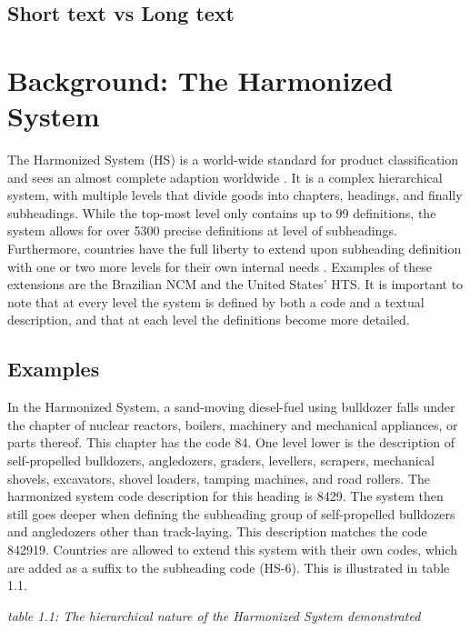 \subsection{Short text vs Long text}

\section{Background: The Harmonized System}
The Harmonized System (HS) is a world-wide standard for product classification and sees an almost complete adaption worldwide \cite{}. It is a complex hierarchical system, with multiple levels that divide goods into chapters, headings, and finally subheadings. While the top-most level only contains up to 99 definitions, the system allows for over 5300 precise definitions at level of subheadings. Furthermore, countries have the full liberty to extend upon subheading definition with one or two more levels for their own internal needs \cite{}. Examples of these extensions are the Brazilian NCM and the United States’ HTS. It is important to note that at every level the system is defined by both a code and a textual description, and that at each level the definitions become more detailed.

\subsection{Examples}
In the Harmonized System, a sand-moving diesel-fuel using bulldozer falls under the chapter of nuclear reactors, boilers, machinery and mechanical appliances, or parts thereof. This chapter has the code 84. One level lower is the description of self-propelled bulldozers, angledozers, graders, levellers, scrapers, mechanical shovels, excavators, shovel loaders, tamping machines, and road rollers. The harmonized system code description for this heading is 8429. The system then still goes deeper when defining the subheading group of self-propelled bulldozers and angledozers other than track-laying. This description matches the code 842919. Countries are allowed to extend this system with their own codes, which are added as a suffix to the subheading code (HS-6). This is illustrated in table 1.1.

\begin{center}
    
\end{center}
{\textit{table 1.1: The hierarchical nature of the Harmonized System demonstrated}} \\

